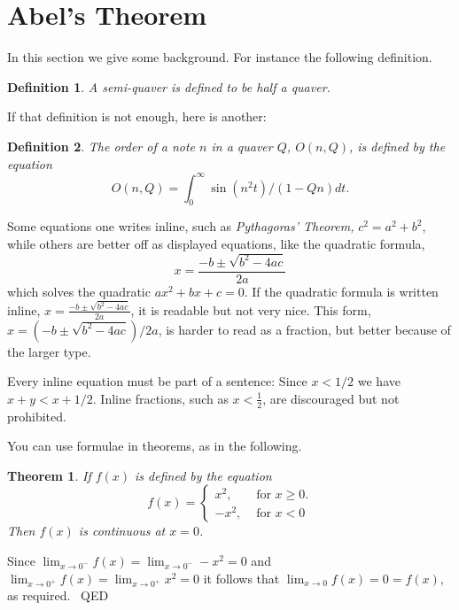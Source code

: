 \documentclass{article}
\newtheorem{theorem}{Theorem}
\newtheorem{definition}{Definition}
\newenvironment{proof}{{\sc Proof:}}{~\hfill QED}
\begin{document}
\section{Abel's Theorem}\label{AbelSection}
     In this section we give some background.  For instance
the following definition.

\begin{definition}
     A {\em semi-quaver} is defined to be half a quaver.
\end{definition}

If that definition is not enough, here is another:

\begin{definition}
    The {\em order} of a note $n$ in a quaver $Q$,
    $O(n,Q)$, is defined by the equation
         $$ O(n,Q) = \int_{0}^{\infty} \sin(n^{2} t)/(1-Qn) dt. $$
\end{definition}

Some equations one writes inline, such as
{\em Pythagoras' Theorem,}
$c^{2} = a^{2} + b^{2}$,
while others are better off as displayed
equations, like the quadratic formula,
  $$x = \frac{-b \pm \sqrt{b^{2} - 4ac}}{2a}$$
which solves the quadratic $ax^{2} + bx + c = 0$. If the quadratic
formula is written inline,
  $x = \frac{-b \pm \sqrt{b^{2} - 4ac}}{2a}$,
it is readable but not very nice.
This form,
  $x = (-b \pm \sqrt{b^{2} - 4ac})/2a$,
is harder to read as a fraction, but better because of the larger type.

Every inline equation must be part of a sentence:  Since $x < 1/2$ we have
$x + y < x + 1/2$.  Inline fractions, such as $x < \frac{1}{2}$, are discouraged but
not prohibited.


You can use formulae in theorems, as in the following.

\begin{theorem}\label{ContThrm}
    If $f(x)$ is defined by the equation
    \begin{equation}\label{SplitFunc}
         f(x) = \left\{ \begin{array}{rl}
                          x^{2}, & \mbox{~for $x \geq 0$.} \\
                         -x^{2}, & \mbox{~for $x < 0$}
                         \end{array} \right.
   \end{equation}
   Then $f(x)$ is continuous at $x=0$.
\end{theorem}


\begin{proof}
    Since
          $\lim_{x \rightarrow 0^{-}} f(x) =
           \lim_{x \rightarrow 0^{-}} -x^{2} = 0$
    and
          $\lim_{x \rightarrow 0^{+}} f(x) =
           \lim_{x \rightarrow 0^{+}} x^{2} = 0$
    it follows that
         $\lim_{x \rightarrow 0} f(x) = 0 = f(x)$,
         as required.
\end{proof}
\end{document}
